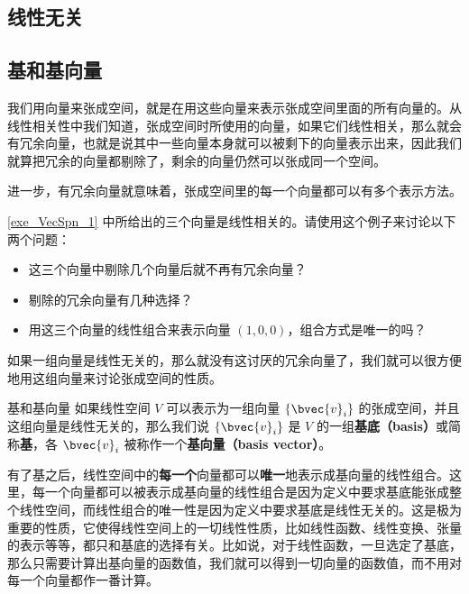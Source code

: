 \subsection{线性无关}

\subsection{基和基向量}

我们用向量来张成空间，就是在用这些向量来表示张成空间里面的所有向量的。从线性相关性中我们知道，张成空间时所使用的向量，如果它们线性相关，那么就会有冗余向量，也就是说其中一些向量本身就可以被剩下的向量表示出来，因此我们就算把冗余的向量都剔除了，剩余的向量仍然可以张成同一个空间。

进一步，有冗余向量就意味着，张成空间里的每一个向量都可以有多个表示方法。

\begin{exercise}{}
\autoref{exe_VecSpn_1} 中所给出的三个向量是线性相关的。请使用这个例子来讨论以下两个问题：
\begin{itemize}
\item 这三个向量中剔除几个向量后就不再有冗余向量？
\item 剔除的冗余向量有几种选择？
\item 用这三个向量的线性组合来表示向量 $(1,0,0)$，组合方式是唯一的吗？
\end{itemize}
\end{exercise}


如果一组向量是线性无关的，那么就没有这讨厌的冗余向量了，我们就可以很方便地用这组向量来讨论张成空间的性质。

\begin{definition}{基和基向量}\label{def_VecSpn_2}
如果线性空间 $V$ 可以表示为一组向量 $\{\bvec{v}_i\}$ 的张成空间，并且这组向量是线性无关的，那么我们说 $\{\bvec{v}_i\}$ 是 $V$ 的一组\textbf{基底（basis）}或简称\textbf{基}，各 $\bvec{v}_i$ 被称作一个\textbf{基向量（basis vector）}。
\end{definition}

有了基之后，线性空间中的\textbf{每一个}向量都可以\textbf{唯一}地表示成基向量的线性组合。这里，每一个向量都可以被表示成基向量的线性组合是因为定义中要求基底能张成整个线性空间，而线性组合的唯一性是因为定义中要求基底是线性无关的。这是极为重要的性质，它使得线性空间上的一切线性性质，比如线性函数、线性变换、张量的表示等等，都只和基底的选择有关。比如说，对于线性函数，一旦选定了基底，那么只需要计算出基向量的函数值，我们就可以得到一切向量的函数值，而不用对每一个向量都作一番计算。

